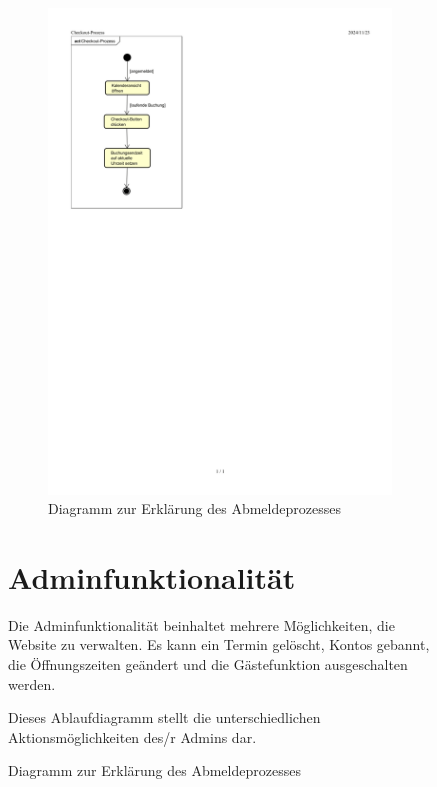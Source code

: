 \begin{figure}[ht]
\begin{figure}[ht]
    \centering
    \includegraphics[width=\textwidth]{figures/activity/checkoutprozess}
    \caption{Diagramm zur Erklärung des Abmeldeprozesses}
    \label{fig:logout-diagram}
\end{figure}

\clearpage

\section{Adminfunktionalität}

Die Adminfunktionalität beinhaltet mehrere Möglichkeiten, die Website zu verwalten.
Es kann ein Termin gelöscht, Kontos gebannt, die Öffnungszeiten geändert und die Gästefunktion
ausgeschalten werden.

Dieses Ablaufdiagramm stellt die unterschiedlichen Aktionsmöglichkeiten des/r Admins dar.


\end{figure}
